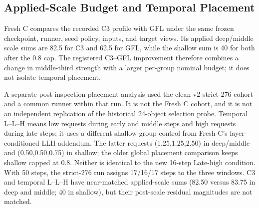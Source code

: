 \documentclass[times,twocolumn,final]{elsarticle}
\providecommand{\DIFadd}[1]{{\protect\color{blue} \sf #1}} %
\providecommand{\DIFaddbegin}{} %
\providecommand{\DIFaddend}{} %
\begin{document}
  \DIFaddbegin \subsection{Applied-Scale Budget and Temporal Placement}
\label{subsec:temporal-placement}

\DIFadd{Fresh C compares the recorded }\DIFaddend C3   \DIFaddbegin \DIFadd{profile with GFL under the same frozen checkpoint, runner, seed policy, inputs, and target views. Its applied deep/middle scale sums are 82.5 for C3 and 62.5 for GFL, while the shallow sum is 40 for both after the 0.8 cap. The registered C3--GFL improvement therefore combines a change in middle-third strength with a larger per-group nominal budget; it does not isolate temporal placement.
}

\DIFadd{A separate post-inspection placement analysis used the clean-v2 strict-276 cohort and a common runner within that run. It is not the Fresh C cohort, and it is not an independent replication of the historical }\DIFaddend 24-object   \DIFaddbegin \DIFadd{selection probe. Temporal L--L--H means low requests during early and middle steps and high requests during late steps; it uses a different shallow-group control from Fresh C's layer-conditioned LLH addendum. The latter requests (1.25,1.25,2.50) in deep/middle and (0.50,0.50,0.75) in shallow; the older global placement comparison keeps shallow capped at 0.8. Neither is identical to }\DIFaddend the   \DIFaddbegin \DIFadd{new 16-step Late-high condition. With 50 steps, the strict-276 run assigns 17/16/17 steps to the three windows. C3 and temporal L--L--H have near-matched applied-scale sums (82.50 versus 83.75 in deep and middle; 40 in shallow), but their post-scale residual magnitudes are not matched.
}\DIFaddend 
\end{document}
